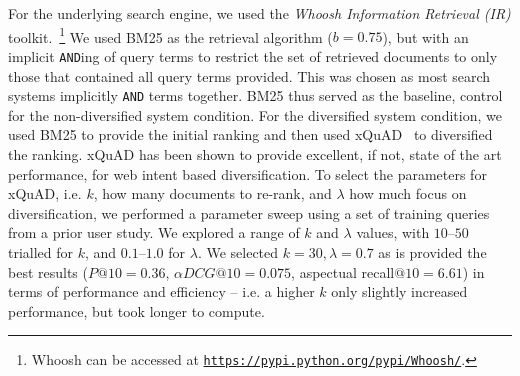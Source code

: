 
For the underlying search engine, we used the \emph{Whoosh Information Retrieval (IR)} toolkit.~\footnote{Whoosh can be accessed at \texttt{\url{https://pypi.python.org/pypi/Whoosh/}}.} We used BM25 as the retrieval algorithm ($b=0.75$), but with an implicit \texttt{AND}ing of query terms to restrict the set of retrieved documents to only those that contained all query terms provided. This was chosen as most search systems implicitly \texttt{AND} terms together. BM25 thus served as the baseline, control for the non-diversified system condition. For the diversified system condition, we used BM25 to provide the initial ranking and then used xQuAD~\cite{santos2010query_reformulations_diversification} to diversified the ranking. xQuAD has been shown to provide excellent, if not, state of the art performance, for web intent based diversification. To select the parameters for xQuAD, i.e. $k$, how many documents to re-rank, and $\lambda$ how much focus on diversification, we performed a parameter sweep using a set of training queries from a prior user study. We explored a range of $k$ and $\lambda$ values, with $10$--$50$ trialled for $k$, and $0.1$--$1.0$ for $\lambda$. We selected $k=30, \lambda=0.7$ as is provided the best results ($P@10=0.36$, $\alpha DCG@10=0.075$, aspectual recall$@10=6.61$) in terms of performance and efficiency -- i.e. a higher $k$ only slightly increased performance, but took longer to compute.

